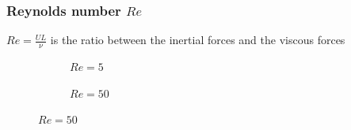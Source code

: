 \documentclass{beamer}
\begin{document}
\begin{frame}[fragile]
\frametitle{Reynolds number $Re$}
$Re = \frac{UL}{\nu}$ is the ratio between the inertial forces and the viscous forces
\begin{figure}
\begin{subfigure}{0.48\textwidth}
\caption{$Re=5$}
\end{subfigure}
\begin{subfigure}{0.48\textwidth}
\caption{$Re=50$}
\end{subfigure}
\end{figure}
\end{frame}
\end{document}

